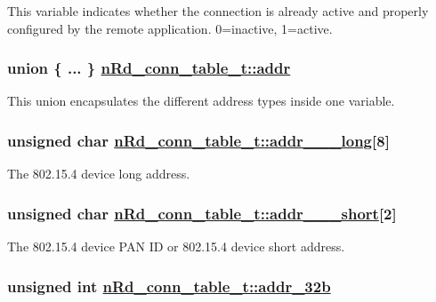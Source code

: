 This variable indicates whether the connection is already active and properly configured by the remote application. 0=inactive, 1=active. \hypertarget{structnRd__conn__table__t_3fa059682daacf2b1a9c62993d22e53f}{
\subsubsection[addr]{\setlength{\rightskip}{0pt plus 5cm}union \{ ... \}   \hyperlink{structnRd__conn__table__t_3fa059682daacf2b1a9c62993d22e53f}{n\-Rd\_\-conn\_\-table\_\-t::addr}}}
\label{structnRd__conn__table__t_3fa059682daacf2b1a9c62993d22e53f}


This union encapsulates the different address types inside one variable. \hypertarget{structnRd__conn__table__t_6c297e055b95f2789f00e341e5aef58e}{
\subsubsection[addr\_\-15\_\-4\_\-long]{\setlength{\rightskip}{0pt plus 5cm}unsigned char \hyperlink{structnRd__conn__table__t_6c297e055b95f2789f00e341e5aef58e}{n\-Rd\_\-conn\_\-table\_\-t::addr\_\_\_\-long}\mbox{[}8\mbox{]}}}
\label{structnRd__conn__table__t_6c297e055b95f2789f00e341e5aef58e}


The 802.15.4 device long address. \hypertarget{structnRd__conn__table__t_b92003a2d27148c501eee1a5d3e1f1a1}{
\subsubsection[addr\_\-15\_\-4\_\-short]{\setlength{\rightskip}{0pt plus 5cm}unsigned char \hyperlink{structnRd__conn__table__t_b92003a2d27148c501eee1a5d3e1f1a1}{n\-Rd\_\-conn\_\-table\_\-t::addr\_\_\_\-short}\mbox{[}2\mbox{]}}}
\label{structnRd__conn__table__t_b92003a2d27148c501eee1a5d3e1f1a1}


The 802.15.4 device PAN ID or 802.15.4 device short address. \hypertarget{structnRd__conn__table__t_ca2bf21d951dd2a9a5f7ae3cfe76c663}{
\subsubsection[addr\_\-32b]{\setlength{\rightskip}{0pt plus 5cm}unsigned int \hyperlink{structnRd__conn__table__t_ca2bf21d951dd2a9a5f7ae3cfe76c663}{n\-Rd\_\-conn\_\-table\_\-t::addr\_\-32b}}}
\label{structnRd__conn__table__t_ca2bf21d951dd2a9a5f7ae3cfe76c663}


